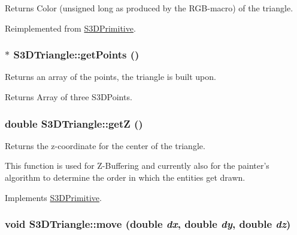 \begin{DoxyReturn}{Returns}
Color (unsigned long as produced by the RGB-\/macro) of the triangle. 
\end{DoxyReturn}


Reimplemented from \hyperlink{class_s3_d_primitive_a4102845e7754e44c51a87c0fcb391c73}{S3DPrimitive}.

\hypertarget{class_s3_d_triangle_a1032adb6846335a47c8e8c0355b69dbd}{
\subsubsection[{getPoints}]{ $\ast$ S3DTriangle::getPoints ()}}
\label{class_s3_d_triangle_a1032adb6846335a47c8e8c0355b69dbd}


Returns an array of the points, the triangle is built upon. 

\begin{DoxyReturn}{Returns}
Array of three S3DPoints. 
\end{DoxyReturn}
\hypertarget{class_s3_d_triangle_a35428b5799c8d51a6c57d1fdb5b575a1}{
\subsubsection[{getZ}]{\setlength{\rightskip}{0pt plus 5cm}double S3DTriangle::getZ ()}}
\label{class_s3_d_triangle_a35428b5799c8d51a6c57d1fdb5b575a1}


Returns the z-\/coordinate for the center of the triangle. 

This function is used for Z-\/Buffering and currently also for the painter's algorithm to determine the order in which the entities get drawn. 

Implements \hyperlink{class_s3_d_primitive_ab5b06d3a8e83216cc42554bb78afd2d9}{S3DPrimitive}.

\hypertarget{class_s3_d_triangle_a7f168122e4ed627fcb6489852a56982b}{
\subsubsection[{move}]{\setlength{\rightskip}{0pt plus 5cm}void S3DTriangle::move (double {\em dx}, \/  double {\em dy}, \/  double {\em dz})}}
\label{class_s3_d_triangle_a7f168122e4ed627fcb6489852a56982b}


